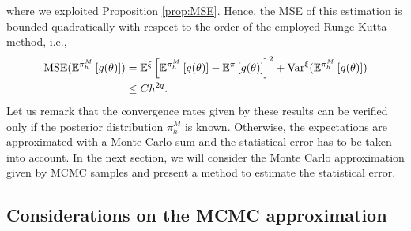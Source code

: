 where we exploited Proposition \ref{prop:MSE}. Hence, the MSE of this estimation is bounded quadratically with respect to the order of the employed Runge-Kutta method, i.e.,  
\begin{equation}
\begin{aligned}
	\operatorname{MSE}(\mathbb{E}^{\pi_h^M}\left[g(\theta)\right]) &= \mathbb{E}^\xi\left[\mathbb{E}^{\pi_h^M}\left[g(\theta)\right] - \mathbb{E}^{\pi}\left[g(\theta)\right]\right]^2 + \operatorname{Var}^\xi(\mathbb{E}^{\pi_h^M}\left[g(\theta)\right]) \\
	&\leq C h^{2q}.
\end{aligned}
\end{equation}
Let us remark that the convergence rates given by these results can be verified only if the posterior distribution $\pi_h^M$ is known. Otherwise, the expectations are approximated with a Monte Carlo sum and the statistical error has to be taken into account. In the next section, we will consider the Monte Carlo approximation given by MCMC samples and present a method to estimate the statistical error. 

\subsection{Considerations on the MCMC approximation}

